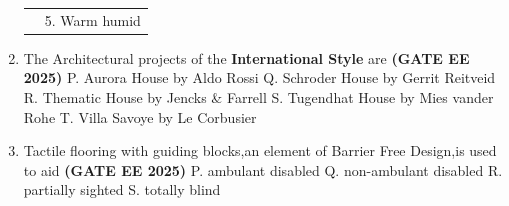 \documentclass[journal,12pt,onecolumn]{IEEEtran}
\theoremstyle{remark}
\begin{document}
\begin{enumerate}
\begin{tabular}{p{}p{}}
  & 5. Warm humid\\
\end{tabular}
\begin{enumerate}
\end{enumerate}
\item The Architectural projects of the \textbf{International Style} are \hfill \textbf{(GATE EE 2025)}
\newline
P. Aurora House by Aldo Rossi
\newline
Q. Schroder House by Gerrit Reitveid
\newline
R. Thematic House by Jencks \& Farrell
\newline
S. Tugendhat House by Mies vander Rohe
\newline
T. Villa Savoye by Le Corbusier
\begin{enumerate}
\end{enumerate}
\item Tactile flooring with guiding blocks,an element of Barrier Free Design,is used to aid \hfill \textbf{(GATE EE 2025)}
\newline
P. ambulant disabled
\newline Q. non-ambulant disabled \newline  R. partially sighted \newline S. totally blind \begin{enumerate}
\end{enumerate}
  

\end{enumerate}
\end{document}
